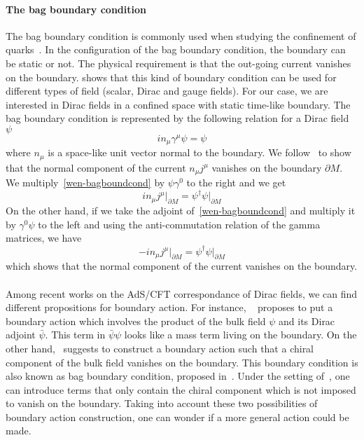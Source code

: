 \paragraph{The bag boundary condition}
The bag boundary condition is commonly used when studying the confinement of quarks~\cite{Hasenfratz1978}.
In the configuration of the bag boundary condition, the boundary can be static or not. 
The physical requirement is that the out-going current vanishes on the boundary.
\cite{Chodos1974} shows that this kind of boundary condition can be used for different types of field (scalar, Dirac and gauge fields). 
For our case, we are interested in Dirac fields in a confined space with static time-like boundary.
The bag boundary condition is represented by the following relation for a Dirac field $\psi$ 
\begin{equation}\label{wen-bagboundcond}
i n_\mu\gamma^\mu \psi = \psi
\end{equation}
where $n_\mu$ is a space-like unit vector normal to the boundary.
We follow~\cite{Stokes2015} to show that the normal component of the current $n_\mu j^\mu$ vanishes on the boundary $\partial M$.
We multiply~\cref{wen-bagboundcond} by $\psi\gamma^0$ to the right and we get
\begin{equation*}
i n_\mu j^\mu \big\vert_{\partial M}= \psi^\dagger\psi \big\vert_{\partial M}
\end{equation*}
On the other hand, if we take the adjoint of~\cref{wen-bagboundcond} and multiply it by $\gamma^0\psi$ to the left and using the anti-commutation relation of the gamma matrices, we have
\begin{equation*}
- i n_\mu j^\mu \big\vert_{\partial M} = \psi^\dagger\psi\big\vert_{\partial M}
\end{equation*}
which shows that the normal component of the current vanishes on the boundary. \\\\
%
Among recent works on the AdS/CFT correspondance of Dirac fields, we can find different propositions for boundary action.
For instance, 
~\cite{Henningson1998} proposes to put a boundary action which involves the product of the bulk field $\psi$ and its Dirac adjoint $\bar{\psi}$. 
This term in $\bar{\psi}\psi$ looks like a mass term living on the boundary.
On the other hand,~\cite{Contino2005} suggests to construct a boundary action such that a chiral component of the bulk field vanishes on the boundary.
This boundary condition is also known as bag boundary condition, proposed in~\cite{Chodos1974}.
Under the setting of~\cite{Contino2005}, one can introduce terms that only contain the chiral component which is not imposed to vanish on the boundary.
Taking into account these two possibilities of boundary action construction, 
one can wonder if a more general action could be made. 
%
%
%











